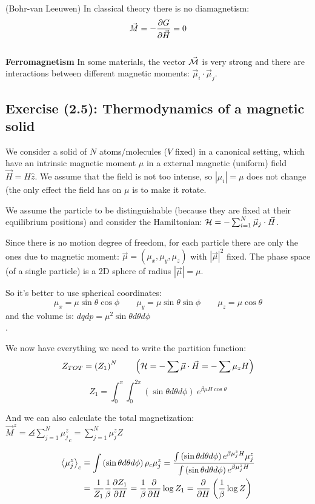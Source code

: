\Th (Bohr-van Leeuwen) In classical theory there is no diamagnetism: 
$$ \vec M = -\frac{\partial G}{\partial\vec H} = 0$$
\\

\textbf{Ferromagnetism} In some materials, the vector $\vec {\mathcal{M}}$ is very strong and there are interactions between different magnetic moments: $\vec \mu_i \cdot \vec \mu_j$.

\subsection{Exercise (2.5): Thermodynamics of a magnetic solid}
We consider a solid of $N$ atoms/molecules ($V$ fixed) in a canonical setting, which have an intrinsic magnetic moment $\mu$ in a external magnetic (uniform) field $\vec H = H\hat z$. We assume that the field is not too intense, so $|\mu_i| = \mu$ does not change (the only effect the field has on $\mu$ is to make it rotate.

We assume the particle to be distinguishable (because they are fixed at their equilibrium positions) and consider the Hamiltonian: $\mathcal{H} = -\sum_{i=1}^N \vec\mu_j \cdot \vec H$.

Since there is no motion degree of freedom, for each particle there are only the ones due to magnetic moment: $\vec \mu = \left(\mu_x,\mu_y,\mu_z\right) $ \quad with $|\vec \mu |^2$ fixed. The phase space (of a single particle) is a 2D sphere of radius $|\vec\mu| = \mu$.

So it's better to use spherical coordinates:
$$ \mu_x = \mu \sin \theta\cos \phi \qquad 
\mu_y = \mu \sin \theta\sin \phi \qquad 
\mu_z = \mu\cos \theta$$
and the volume is: $dqdp = \mu^2\sin\theta d\theta d\phi$\\
.

We now have everything we need to write the partition function:
$$Z_{TOT} = \left(Z_1\right)^N \qquad \left(\mathcal{H} = -\sum \vec \mu \cdot \vec H = -\sum \mu_z H\right)$$
$$ Z_1 = \int_0^\pi \int_0^{2\pi} \left(\sin\theta d\theta d\phi\right) \ e^{\beta \mu H \cos \theta}$$

And we can also calculate the total magnetization: $\vec M ^z = \angles{\sum_{j=1}^N \mu_j^z}_c = \sum_{j=1}^N \mu_j^z Z$

\begin{align*}
\left<\mu_j^z\right>_c &\equiv \int\left(\sin\theta d\theta d\phi\right) \rho_c \mu_j^z = \frac{\int\left(\sin\theta d\theta d\phi\right) e^{\beta \mu_j^z H}\mu_j^z}{\int\left(\sin\theta d\theta d\phi\right) e^{\beta \mu_j^zH}} \\
&= \frac 1{Z_1} \frac 1\beta \frac{\partial Z_1}{\partial H} = \frac 1\beta \frac{\partial}{\partial H} \log Z_1 = \frac{\partial}{\partial H} \left(\frac1\beta \log Z\right)
\end{align*}

